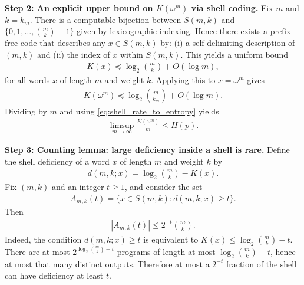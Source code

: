 \documentclass[12pt]{article}
\newcommand{\be}{\begin{eqnarray}}
\newcommand{\ee}{\end{eqnarray}}
\newcommand{\dom}{\preceq}
\begin{document}
\medskip
\noindent
{\bf Step 2: An explicit upper bound on $K(\omega^{m})$ via shell coding.}
Fix $m$ and $k=k_m$. There is a computable bijection between $S(m,k)$ and $\{0,1,\dots,\binom{m}{k}-1\}$ given by lexicographic indexing. Hence there exists a prefix-free code that describes any $x\in S(m,k)$ by:
(i) a self-delimiting description of $(m,k)$ and
(ii) the index of $x$ within $S(m,k)$.
This yields a uniform bound
\be
K(x) \dom \log_2\binom{m}{k} + O(\log m),
\label{eq:K_upper_shell2}
\ee
for all words $x$ of length $m$ and weight $k$. Applying this to $x=\omega^{m}$ gives
\be
K(\omega^{m}) \dom \log_2\binom{m}{k_m} + O(\log m).
\label{eq:K_upper_on_prefix}
\ee
Dividing by $m$ and using \eqref{eq:shell_rate_to_entropy} yields
\be
\limsup_{m\to\infty}\frac{K(\omega^{m})}{m}
\le
H(p).
\label{eq:limsup_bound}
\ee

\medskip
\noindent
{\bf Step 3: Counting lemma: large deficiency inside a shell is rare.}
Define the shell deficiency of a word $x$ of length $m$ and weight $k$ by
\be
d(m,k;x)=\log_2\binom{m}{k}-K(x).
\label{eq:deficiency_def}
\ee
Fix $(m,k)$ and an integer $t\ge 1$, and consider the set
\be
A_{m,k}(t)=\{x\in S(m,k): d(m,k;x)\ge t\}.
\label{eq:Amk_def}
\ee
Then
\be
|A_{m,k}(t)| \le 2^{-t}\binom{m}{k}.
\label{eq:counting_lemma}
\ee
Indeed, the condition $d(m,k;x)\ge t$ is equivalent to $K(x)\le \log_2\binom{m}{k}-t$.
There are at most $2^{\log_2\binom{m}{k}-t}$ programs of length at most $\log_2\binom{m}{k}-t$, hence at most that many distinct outputs. Therefore at most a $2^{-t}$ fraction of the shell can have deficiency at least $t$.
\end{document}
